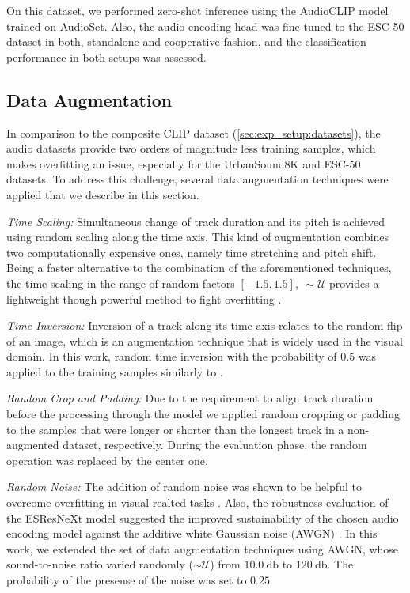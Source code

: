 \documentclass[runningheads]{llncs}
\begin{document}
On this dataset, we performed zero-shot inference using the \mbox{AudioCLIP} model trained on \mbox{AudioSet}.
Also, the audio encoding head was fine-tuned to the \mbox{ESC-50} dataset in both, standalone and cooperative fashion, and the classification performance in both setups was assessed.

\subsection{Data Augmentation} \label{sec:exp_setup:data_aug}
In comparison to the composite CLIP dataset (\autoref{sec:exp_setup:datasets}), the audio datasets provide two orders of magnitude less training samples, which makes overfitting an issue, especially for the \mbox{UrbanSound8K} and \mbox{ESC-50} datasets.
To address this challenge, several data augmentation techniques were applied that we describe in this section.

\emph{Time Scaling:} Simultaneous change of track duration and its pitch is achieved using random scaling along the time axis.
This kind of augmentation combines two computationally expensive ones, namely time stretching and pitch shift.
Being a faster alternative to the combination of the aforementioned techniques, the time scaling in the range of random factors $[-1.5,1.5],\:\sim\mathcal{U}$ provides a lightweight though powerful method to fight overfitting \cite{guzhov2020esrn}.

\emph{Time Inversion:} Inversion of a track along its time axis relates to the random flip of an image, which is an augmentation technique that is widely used in the visual domain.
In this work, random time inversion with the probability of $0.5$ was applied to the training samples similarly to \cite{guzhov2021esrnx}.

\emph{Random Crop and Padding:} Due to the requirement to align track duration before the processing through the model we applied random cropping or padding to the samples that were longer or shorter than the longest track in a non-augmented dataset, respectively.
During the evaluation phase, the random operation was replaced by the center one.

\emph{Random Noise:} The addition of random noise was shown to be helpful to overcome overfitting in visual-realted tasks \cite{hussain2017augment}.
Also, the robustness evaluation of the \mbox{ESResNeXt} model suggested the improved sustainability of the chosen audio encoding model against the additive white Gaussian noise (AWGN) \cite{guzhov2021esrnx}.
In this work, we extended the set of data augmentation techniques using AWGN, whose sound-to-noise ratio varied randomly ($\sim \mathcal{U}$) from $10.0\:\si{\decibel}$ to $120\:\si{\decibel}$.
The probability of the presense of the noise was set to $0.25$.
\end{document}
